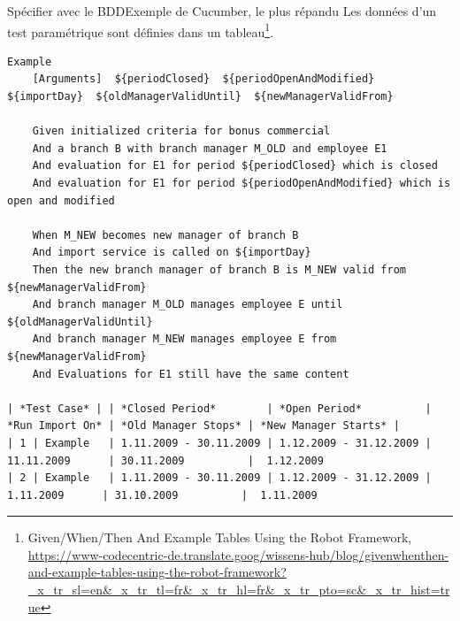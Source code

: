 \documentclass{beamer}
\begin{document}
    \begin{frame}[fragile]{Spécifier avec le BDD}{Exemple de Cucumber, le plus répandu}
        \transdissolve
        Les données d'un test paramétrique sont définies dans un tableau\footnote{Given/When/Then And Example Tables Using the Robot Framework, \url{https://www-codecentric-de.translate.goog/wissens-hub/blog/givenwhenthen-and-example-tables-using-the-robot-framework?_x_tr_sl=en&_x_tr_tl=fr&_x_tr_hl=fr&_x_tr_pto=sc&_x_tr_hist=true}}.
        \begin{lstlisting}[basicstyle=\ttfamily\tiny]
Example
    [Arguments]  ${periodClosed}  ${periodOpenAndModified}  ${importDay}  ${oldManagerValidUntil}  ${newManagerValidFrom}

    Given initialized criteria for bonus commercial
    And a branch B with branch manager M_OLD and employee E1
    And evaluation for E1 for period ${periodClosed} which is closed
    And evaluation for E1 for period ${periodOpenAndModified} which is open and modified

    When M_NEW becomes new manager of branch B
    And import service is called on ${importDay}
    Then the new branch manager of branch B is M_NEW valid from ${newManagerValidFrom}
    And branch manager M_OLD manages employee E until ${oldManagerValidUntil}
    And branch manager M_NEW manages employee E from ${newManagerValidFrom}
    And Evaluations for E1 still have the same content

| *Test Case* | | *Closed Period*        | *Open Period*          | *Run Import On* | *Old Manager Stops* | *New Manager Starts* |
| 1 | Example   | 1.11.2009 - 30.11.2009 | 1.12.2009 - 31.12.2009 | 11.11.2009      | 30.11.2009          |  1.12.2009
| 2 | Example   | 1.11.2009 - 30.11.2009 | 1.12.2009 - 31.12.2009 |  1.11.2009      | 31.10.2009          |  1.11.2009
        \end{lstlisting}
    \end{frame}
\end{document}
